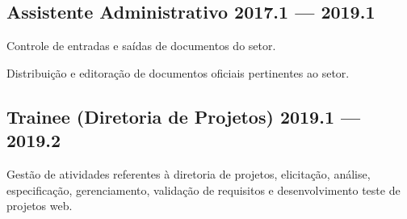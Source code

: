 \documentclass[letter,10pt]{article}
\begin{document}
\subsection{{Assistente Administrativo \hfill 2017.1 --- 2019.1}}
\begin{zitemize}
\item Controle de entradas e saídas de documentos do setor.
\item Distribuição e editoração
de documentos oficiais pertinentes ao setor.

\end{zitemize}

\subsection{{Trainee (Diretoria de Projetos) \hfill 2019.1 --- 2019.2}}
\begin{zitemize}
\item Gestão de atividades referentes à diretoria de projetos, elicitação, análise,
especificação, gerenciamento, validação de requisitos e desenvolvimento teste de
projetos web.
\end{zitemize}





\end{document}
